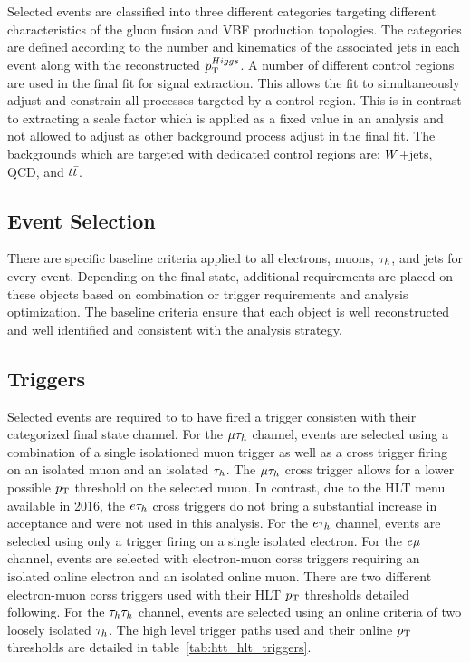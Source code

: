 Selected events are classified into three different categories targeting different characteristics
of the gluon fusion and VBF production topologies.  The categories are defined according to the
number and kinematics of the associated jets in each event along with the reconstructed $p_\mathrm{T}^{Higgs}$.
A number of different control regions are used in the final fit for signal extraction.  This allows
the fit to simultaneously adjust and constrain all processes targeted by a control region.  This is in
contrast to extracting a scale factor which is applied as a fixed value in an analysis and not
allowed to adjust as other background process adjust in the final fit.  The backgrounds which are
targeted with dedicated control regions are: $W$+jets, QCD, and $t\bar{t}$.



\subsection{Event Selection}

There are specific baseline criteria applied to all electrons, muons, $\tau_{h}$, and jets for every
event.  Depending on the final state, additional requirements are placed on these objects based
on combination or trigger requirements and analysis optimization.  The baseline criteria ensure
that each object is well reconstructed and well identified and consistent with the analysis
strategy. 

\subsection{Triggers}
Selected events are required to to have fired a trigger consisten with their categorized final
state channel.  For the $\mu\tau_{h}$ channel, events are selected using a combination
of a single isolationed muon trigger as well as a cross trigger firing on an isolated muon and
an isolated $\tau_{h}$.  The $\mu\tau_{h}$ cross trigger allows for a lower possible $p_\mathrm{T}$ threshold
on the selected muon.  In contrast, due to the HLT menu available in 2016, the $e\tau_{h}$ cross triggers
do not bring a substantial increase in acceptance and were not used in this analysis.
For the $e\tau_{h}$ channel, events are selected using only a trigger firing on a 
single isolated electron.  For the $e\mu$ channel, events are selected with electron-muon corss
triggers requiring an isolated online electron and an isolated online muon.  There are two 
different electron-muon corss triggers used with their HLT $p_\mathrm{T}$ thresholds detailed following.
For the $\tau_{h}\tau_{h}$ channel, events are selected using an online criteria of two loosely isolated $\tau_{h}$.  
The high level trigger paths used and their online $p_\mathrm{T}$ thresholds are detailed in table~\ref{tab:htt_hlt_triggers}.

